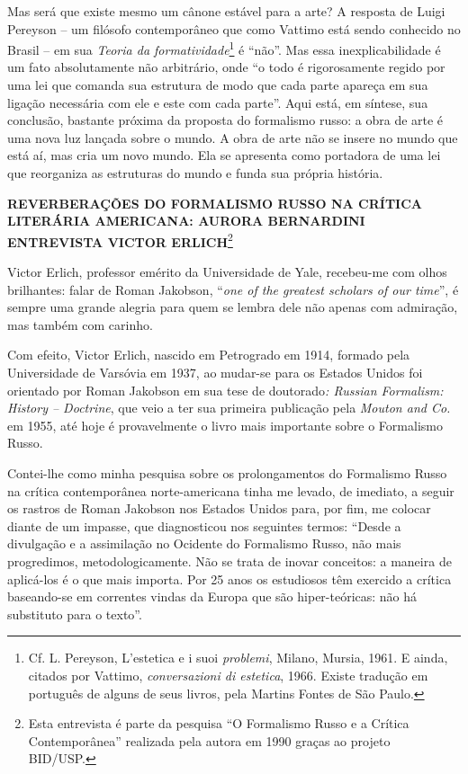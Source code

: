 Mas será que existe mesmo um cânone estável para a arte? A resposta de
Luigi Pereyson -- um filósofo contemporâneo que como Vattimo está sendo
conhecido no Brasil -- em sua \emph{Teoria da formatividade}\footnote{Cf.
  L. Pereyson, L'estetica e i suoi \emph{problemi}, Milano, Mursia,
  1961. E ainda, citados por Vattimo, \emph{conversazioni di estetica},
  1966. Existe tradução em português de alguns de seus livros, pela
  Martins Fontes de São Paulo.} é ``não''. Mas essa inexplicabilidade é
um fato absolutamente não arbitrário, onde ``o todo é rigorosamente
regido por uma lei que comanda sua estrutura de modo que cada parte
apareça em sua ligação necessária com ele e este com cada parte''. Aqui
está, em síntese, sua conclusão, bastante próxima da proposta do
formalismo russo: a obra de arte é uma nova luz lançada sobre o mundo. A
obra de arte não se insere no mundo que está aí, mas cria um novo mundo.
Ela se apresenta como portadora de uma lei que reorganiza as estruturas
do mundo e funda sua própria história.

\textbf{REVERBERAÇÕES DO FORMALISMO RUSSO NA CRÍTICA LITERÁRIA
AMERICANA: AURORA BERNARDINI ENTREVISTA VICTOR ERLICH}\footnote{Esta
  entrevista é parte da pesquisa ``O Formalismo Russo e a Crítica
  Contemporânea'' realizada pela autora em 1990 graças ao projeto
  BID/USP.}

Victor Erlich, professor emérito da Universidade de Yale, recebeu-me com
olhos brilhantes: falar de Roman Jakobson, ``\emph{one of the greatest
scholars of our time}'', é sempre uma grande alegria para quem se lembra
dele não apenas com admiração, mas também com carinho.

Com efeito, Victor Erlich, nascido em Petrogrado em 1914, formado pela
Universidade de Varsóvia em 1937, ao mudar-se para os Estados Unidos foi
orientado por Roman Jakobson em sua tese de doutorado\emph{: Russian
Formalism: History -- Doctrine}, que veio a ter sua primeira publicação
pela \emph{Mouton and Co.} em 1955, até hoje é provavelmente o livro
mais importante sobre o Formalismo Russo.

Contei-lhe como minha pesquisa sobre os prolongamentos do Formalismo
Russo na crítica contemporânea norte-americana tinha me levado, de
imediato, a seguir os rastros de Roman Jakobson nos Estados Unidos para,
por fim, me colocar diante de um impasse, que diagnosticou nos seguintes
termos: ``Desde a divulgação e a assimilação no Ocidente do Formalismo
Russo, não mais progredimos, metodologicamente. Não se trata de inovar
conceitos: a maneira de aplicá-los é o que mais importa. Por 25 anos os
estudiosos têm exercido a crítica baseando-se em correntes vindas da
Europa que são hiper-teóricas: não há substituto para o texto''.

